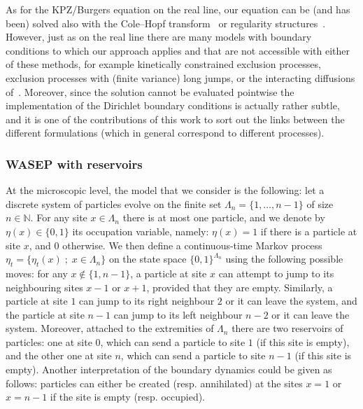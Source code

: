 \documentclass[AHL,Unicode,longabstracts]{cedram}
\newcommand{\bb}[1]{{\mathbb #1}}
\begin{document}
As for the KPZ/Burgers equation on the real line, our equation can be (and has been) solved also with the Cole--Hopf transform~\cite{Corwin2016,Parekh2017} or regularity structures~\cite{Gerencser2018}. However, just as on the real line there are many models with boundary conditions to which our approach applies and that are not accessible with either of these methods, for example kinetically constrained exclusion processes, exclusion processes with (finite variance) long jumps, or the interacting diffusions of~\cite{Diehl2017}. Moreover, since the solution cannot be evaluated pointwise the implementation of the Dirichlet boundary conditions is actually rather subtle, and it is one of the contributions of this work to sort out the links between the different formulations (which in general correspond to different processes).


\subsubsection{WASEP with reservoirs} At the microscopic level, the model that we consider is the following: let a discrete system of particles evolve on the finite set $\Lambda_n=\{1,\dots,n-1\}$ of size $n\in\bb N$. For any site $x\in\Lambda_n$ there is at most one particle, and we denote by $\eta(x)\in\{0,1\}$ its occupation variable, namely: $\eta(x)=1$ if there is a particle at site $x$, and 0 otherwise. We then define a continuous-time Markov process $\eta_t=\{\eta_t(x)\; ; \; x\in\Lambda_n\}$ on the state space $\{0,1\}^{\Lambda_n}$ using the following possible moves: for any $x \notin\{1,n-1\}$, a particle at site $x$ can attempt to jump to its neighbouring sites $x-1$ or $x+1$, provided that they are empty. Similarly, a particle at site $1$ can jump to its right neighbour $2$ or it can leave the system, and the particle at site $n-1$ can jump to its left neighbour $n-2$ or it can leave the system. Moreover, attached to the extremities of $\Lambda_n$ there are two reservoirs of particles: one at site $0$, which can send a particle to site $1$ (if this site is empty), and the other one at site $n$, which can send a particle to site $n-1$ (if this site is empty). Another interpretation of the boundary dynamics could be given as follows: particles can either be created (resp. annihilated) at the sites $x=1$ or $x=n-1$ if the site is empty (resp. occupied).
\end{document}
